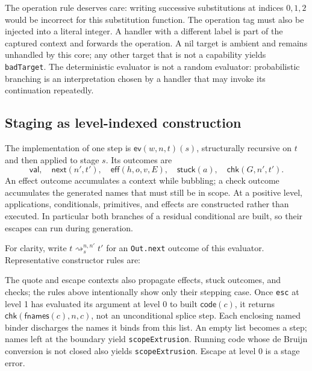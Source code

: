 \documentclass[acmsmall,screen,review,nonacm]{acmart}
\newcommand{\kw}[1]{\mathsf{#1}}
\newcommand{\lam}[1]{\kw{lam}(#1)}
\newcommand{\code}[1]{\kw{code}(#1)}
\newcommand{\esc}[1]{\kw{esc}(#1)}
\newcommand{\run}[1]{\kw{run}(#1)}
\newcommand{\src}[1]{{\normalfont\nolinkurl{#1}}}
\begin{document}
The operation rule deserves care: writing successive substitutions at indices
$0,1,2$ would be incorrect for this substitution function. The operation tag
must also be injected into a literal integer. A handler with a different
label is part of the captured context and forwards the operation. A nil target
is ambient and remains unhandled by this core; any other target that is not
a capability yields \src{badTarget}. The deterministic evaluator is not a
random evaluator: probabilistic branching is an interpretation chosen by a
handler that may invoke its continuation repeatedly.

\subsection{Staging as level-indexed construction}\label{sec:stages}
The implementation of one step is $\kw{ev}(w,n,t)(s)$, structurally recursive
on $t$ and then applied to stage $s$. Its outcomes are
\[
\kw{val},\quad\kw{next}(n',t'),\quad\kw{eff}(h,o,v,E),\quad
\kw{stuck}(a),\quad\kw{chk}(G,n',t').
\]
An effect outcome accumulates a context while bubbling; a check outcome
accumulates the generated names that must still be in scope. At a positive
level, applications, conditionals, primitives, and effects are constructed
rather than executed. In particular both branches of a residual conditional
are built, so their escapes can run during generation.

For clarity, write $t\rightsquigarrow_s^{n,n'}t'$ for an \src{Out.next}
outcome of this evaluator. Representative constructor rules are:
The quote and escape contexts also propagate effects, stuck outcomes, and
checks; the rules above intentionally show only their stepping case. Once
\src{esc} at level 1 has evaluated its argument at level 0 to built
$\code c$, it returns $\kw{chk}(\kw{fnames}(c),n,c)$, not an unconditional
splice step. Each enclosing named binder discharges the names it binds from
this list. An empty list becomes a step; names left at the boundary yield
\src{scopeExtrusion}. Running code whose de Bruijn conversion is not closed
also yields \src{scopeExtrusion}. Escape at level 0 is a stage error.
\end{document}
